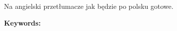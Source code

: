 \begin{center}
\large \bf
\thetitle
\end{center}

Na angielski przetłumacze jak będzie po polsku gotowe.

\bigskip
{\noindent\bf Keywords:} \keywordsEng

\vfill

